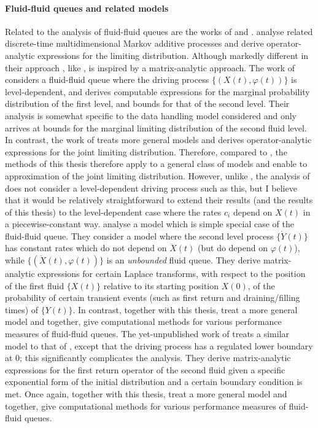 \paragraph{Fluid-fluid queues and related models} Related to the analysis of fluid-fluid queues are the works of \cite{mz2012,lnp13,bo2013b} and \cite{bop2020}. \cite{mz2012} analyse related discrete-time multidimensional Markov additive processes and derive operator-analytic expressions for the limiting distribution. Although markedly different in their approach \cite{mz2012}, like  \cite{bo2014}, is inspired by a matrix-analytic approach. The work of \cite{lnp13} considers a fluid-fluid queue where the driving process \(\{(X(t),\varphi(t))\}\) is level-dependent, and derives computable expressions for the marginal probability distribution of the first level, and bounds for that of the second level. Their analysis is somewhat specific to the data handling model considered and only arrives at bounds for the marginal limiting distribution of the second fluid level. In contrast, the work of \cite{bo2014} treats more general models and derives operator-analytic expressions for the joint limiting distribution. Therefore, compared to \cite{lnp13}, the methods of this thesis therefore apply to a general class of models and enable to approximation of the joint limiting distribution. However, unlike \cite{lnp13}, the analysis of \cite{bo2014} does not consider a level-dependent driving process such as this, but I believe that it would be relatively straightforward to extend their results (and the results of this thesis) to the level-dependent case where the rates \(c_i\) depend on \(X(t)\) in a piecewise-constant way. \cite{bo2013b} analyse a model which is simple special case of the fluid-fluid queue. They consider a model where the second level process \(\{\dot Y(t)\}\) has constant rates which do not depend on \(\ddot X(t)\) (but do depend on \(\varphi(t)\)), while \(\{(\ddot X(t),\varphi(t))\}\) is an \emph{unbounded} fluid queue. They derive matrix-analytic expressions for certain Laplace transforms, with respect to the position of the first fluid \(\{X(t)\}\) relative to its starting position \(X(0)\), of the probability of certain transient events (such as first return and draining/filling times) of \(\{Y(t)\}\). In contrast, \cite{bo2013b} together with this thesis, treat a more general model and together, give computational methods for various performance measures of fluid-fluid queues. The yet-unpublished work of \cite{bop2020} treats a similar model to that of \cite{bo2013b}, except that the driving process has a regulated lower boundary at \(0\); this significantly complicates the analysis. They derive matrix-analytic expressions for the first return operator of the second fluid given a specific exponential form of the initial distribution and a certain boundary condition is met. Once again, \cite{bo2013b} together with this thesis, treat a more general model and together, give computational methods for various performance measures of fluid-fluid queues.

